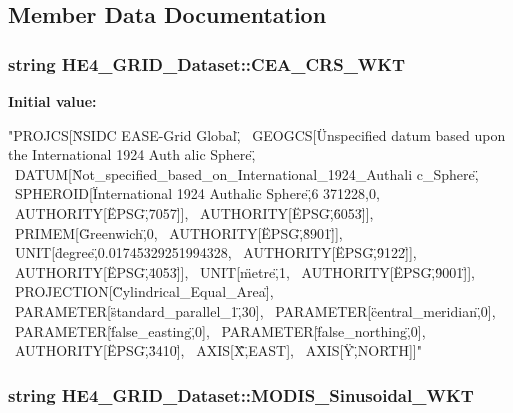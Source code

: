 \subsection{Member Data Documentation}
\hypertarget{classHE4__GRID__Dataset_a6e87bb6abdb928a2af04232bef254667}{
\subsubsection[{CEA\_\-CRS\_\-WKT}]{\setlength{\rightskip}{0pt plus 5cm}string HE4\_\-GRID\_\-Dataset::CEA\_\-CRS\_\-WKT}}
\label{classHE4__GRID__Dataset_a6e87bb6abdb928a2af04232bef254667}
{\bfseries Initial value:}
\begin{DoxyCode}
"PROJCS[\"NSIDC EASE-Grid Global\", \
                GEOGCS[\"Unspecified datum based upon the International 1924 Auth
      alic Sphere\", \
                        DATUM[\"Not_specified_based_on_International_1924_Authali
      c_Sphere\", \
                                SPHEROID[\"International 1924 Authalic Sphere\",6
      371228,0, \
                                        AUTHORITY[\"EPSG\",\"7057\"]], \
                                AUTHORITY[\"EPSG\",\"6053\"]], \
                        PRIMEM[\"Greenwich\",0, \
                                AUTHORITY[\"EPSG\",\"8901\"]], \
                        UNIT[\"degree\",0.01745329251994328, \
                                AUTHORITY[\"EPSG\",\"9122\"]], \
                        AUTHORITY[\"EPSG\",\"4053\"]], \
                UNIT[\"metre\",1, \
                        AUTHORITY[\"EPSG\",\"9001\"]], \
                PROJECTION[\"Cylindrical_Equal_Area\"], \
                PARAMETER[\"standard_parallel_1\",30], \
                PARAMETER[\"central_meridian\",0], \
                PARAMETER[\"false_easting\",0], \
                PARAMETER[\"false_northing\",0], \
                AUTHORITY[\"EPSG\",\"3410\"], \
                AXIS[\"X\",EAST], \
                AXIS[\"Y\",NORTH]]"
\end{DoxyCode}
\hypertarget{classHE4__GRID__Dataset_ab96a75584a7775cc29c52b3004a31d3e}{
\subsubsection[{MODIS\_\-Sinusoidal\_\-WKT}]{\setlength{\rightskip}{0pt plus 5cm}string HE4\_\-GRID\_\-Dataset::MODIS\_\-Sinusoidal\_\-WKT}}
